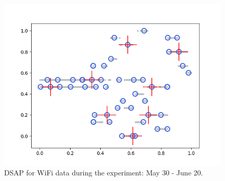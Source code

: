 \begin{figure}[!h]
    \centering
    \includegraphics[width = 10 cm]{image/Chapters/Chapter6/DSAPalldays.png}
    \caption{ DSAP for WiFi data during the experiment: May 30 - June 20.}
    \label{1}
\end{figure}










